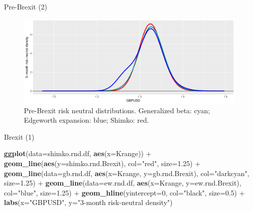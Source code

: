 \documentclass[ignorenonframetext,aspectratio=169]{beamer}
\newenvironment{Shaded}{}{}
\newcommand{\KeywordTok}[1]{\textcolor[rgb]{0.00,0.44,0.13}{\textbf{#1}}}
\newcommand{\DataTypeTok}[1]{\textcolor[rgb]{0.56,0.13,0.00}{#1}}
\newcommand{\DecValTok}[1]{\textcolor[rgb]{0.25,0.63,0.44}{#1}}
\newcommand{\FloatTok}[1]{\textcolor[rgb]{0.25,0.63,0.44}{#1}}
\newcommand{\StringTok}[1]{\textcolor[rgb]{0.25,0.44,0.63}{#1}}
\newcommand{\OperatorTok}[1]{\textcolor[rgb]{0.40,0.40,0.40}{#1}}
\newcommand{\NormalTok}[1]{#1}
\begin{document}
\begin{frame}{Pre-Brexit (2)}

\begin{figure}
\includegraphics[width=1\linewidth]{2018_02_07_IMF_FXCourse_files/figure-beamer/unnamed-chunk-78-1} \caption{Pre-Brexit risk neutral distributions. Generalized beta: cyan; Edgeworth expansion: blue; Shimko: red.}\label{fig:unnamed-chunk-78}
\end{figure}

\end{frame}

\begin{frame}[fragile]{Brexit (1)}

\begin{Shaded}
\begin{Highlighting}[]
\KeywordTok{ggplot}\NormalTok{(}\DataTypeTok{data=}\NormalTok{shimko.rnd.df, }\KeywordTok{aes}\NormalTok{(}\DataTypeTok{x=}\NormalTok{Krange)) }\OperatorTok{+}\StringTok{ }
\StringTok{  }\KeywordTok{geom_line}\NormalTok{(}\KeywordTok{aes}\NormalTok{(}\DataTypeTok{y=}\NormalTok{shimko.rnd.Brexit), }\DataTypeTok{col=}\StringTok{"red"}\NormalTok{, }\DataTypeTok{size=}\FloatTok{1.25}\NormalTok{) }\OperatorTok{+}
\StringTok{  }\KeywordTok{geom_line}\NormalTok{(}\DataTypeTok{data=}\NormalTok{gb.rnd.df, }\KeywordTok{aes}\NormalTok{(}\DataTypeTok{x=}\NormalTok{Krange, }\DataTypeTok{y=}\NormalTok{gb.rnd.Brexit), }
            \DataTypeTok{col=}\StringTok{"darkcyan"}\NormalTok{, }\DataTypeTok{size=}\FloatTok{1.25}\NormalTok{) }\OperatorTok{+}
\StringTok{  }\KeywordTok{geom_line}\NormalTok{(}\DataTypeTok{data=}\NormalTok{ew.rnd.df, }\KeywordTok{aes}\NormalTok{(}\DataTypeTok{x=}\NormalTok{Krange, }\DataTypeTok{y=}\NormalTok{ew.rnd.Brexit), }
            \DataTypeTok{col=}\StringTok{"blue"}\NormalTok{, }\DataTypeTok{size=}\FloatTok{1.25}\NormalTok{) }\OperatorTok{+}
\StringTok{  }\KeywordTok{geom_hline}\NormalTok{(}\DataTypeTok{yintercept=}\DecValTok{0}\NormalTok{, }\DataTypeTok{col=}\StringTok{"black"}\NormalTok{, }\DataTypeTok{size=}\FloatTok{0.5}\NormalTok{) }\OperatorTok{+}
\StringTok{  }\KeywordTok{labs}\NormalTok{(}\DataTypeTok{x=}\StringTok{"GBPUSD"}\NormalTok{, }\DataTypeTok{y=}\StringTok{"3-month risk-neutral density"}\NormalTok{) }
\end{Highlighting}
\end{Shaded}

\end{frame}
\end{document}
